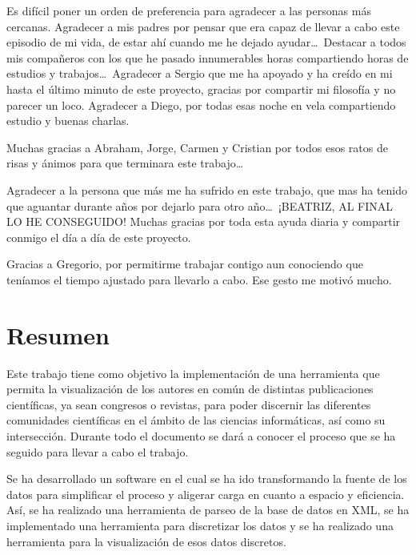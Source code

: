 \documentclass[a4paper, 12pt]{book}
\begin{document}
Es difícil poner un orden de preferencia para agradecer a las personas más cercanas. Agradecer a mis padres por pensar que era capaz de llevar a cabo este episodio de mi vida, de estar ahí cuando me he dejado ayudar\ldots ~Destacar a todos mis compañeros con los que he pasado innumerables horas compartiendo horas de estudios y trabajos\ldots ~Agradecer a Sergio que me ha apoyado y ha creído en mi hasta el último minuto de este proyecto, gracias por compartir mi filosofía y no parecer un loco. Agradecer a Diego, por todas esas noche en vela compartiendo estudio y buenas charlas. 

Muchas gracias a Abraham, Jorge, Carmen y Cristian por todos esos ratos de risas y ánimos para que terminara este trabajo\ldots

Agradecer a la persona que más me ha sufrido en este trabajo, que mas ha tenido que aguantar durante años por dejarlo para otro año\ldots ~¡BEATRIZ, AL FINAL LO HE CONSEGUIDO! Muchas gracias por toda esta ayuda diaria y compartir conmigo el día a día de este proyecto.

Gracias a Gregorio, por permitirme trabajar contigo aun conociendo que teníamos el tiempo ajustado para llevarlo a cabo. Ese gesto me motivó mucho.


\chapter*{Resumen}

Este trabajo tiene como objetivo la implementación de una herramienta que permita la visualización de los autores en común de distintas publicaciones científicas, ya sean congresos o revistas, para poder discernir las diferentes comunidades científicas en el ámbito de las ciencias informáticas, así como su intersección. Durante todo el documento se dará a conocer el proceso que se ha seguido para llevar a cabo el trabajo.

Se ha desarrollado un software en el cual se ha ido transformando la fuente de los datos para simplificar el proceso y aligerar carga en cuanto a espacio y eficiencia. Así, se ha realizado una herramienta de parseo de la base de datos en XML, se ha implementado una herramienta para discretizar los datos y se ha realizado una herramienta para la visualización de esos datos discretos.
\end{document}
